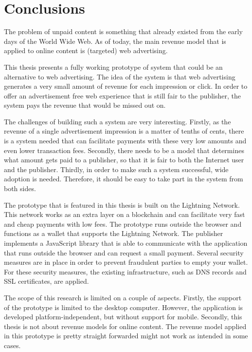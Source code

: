 \chapter{Conclusions}
\label{cha:conclusion}

The problem of unpaid content is something that already existed from the early days of the World Wide Web. As of today, the main revenue model that is applied to online content is (targeted) web advertising.


This thesis presents a fully working prototype of system that could be an alternative to web advertising. The idea of the system is that web advertising generates a very small amount of revenue for each impression or click. In order to offer an advertisement free web experience that is still fair to the publisher, the system pays the revenue that would be missed out on. 

The challenges of building such a system are very interesting. Firstly, as the revenue of a single advertisement impression is a matter of tenths of cents, there is a system needed that can facilitate payments with these very low amounts and even lower transaction fees. Secondly, there needs to be a model that determines what amount gets paid to a publisher, so that it is fair to both the Internet user and the publisher. Thirdly, in order to make such a system successful, wide adoption is needed. Therefore, it should be easy to take part in the system from both sides.

The prototype that is featured in this thesis is built on the Lightning Network. This network works as an extra layer on a blockchain and can facilitate very fast and cheap payments with low fees. The prototype runs outside the browser and functions as a wallet that supports the Lightning Network. The publisher implements a JavaScript library that is able to communicate with the application that runs outside the browser and can request a small payment. Several security measures are in place in order to prevent fraudulent parties to empty your wallet. For these security measures, the existing infrastructure, such as DNS records and SSL certificates, are applied. 

The scope of this research is limited on a couple of aspects. Firstly, the support of the prototype is limited to the desktop computer. However, the application is developed platform-independent, but without support for mobile. Secondly, this thesis is not about revenue models for online content. The revenue model applied in this prototype is pretty straight forwarded might not work as intended in some cases. 

